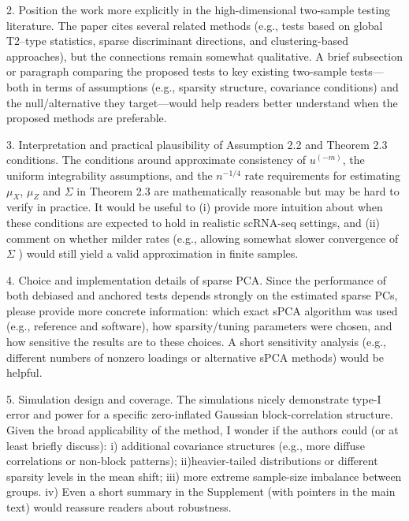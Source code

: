 \documentclass{article}
\theoremstyle{definition}
\begin{document}
\begin{shaded}
2. Position the work more explicitly in the high-dimensional two-sample testing literature.
The paper cites several related methods (e.g., tests based on global T2–type statistics, sparse discriminant directions, and clustering-based approaches), but the connections remain somewhat qualitative. A brief subsection or paragraph comparing the proposed tests to key existing two-sample tests—both in terms of assumptions (e.g., sparsity structure, covariance conditions) and the null/alternative they target—would help readers better understand when the proposed methods are preferable.
\end{shaded}

\begin{shaded}
    3. Interpretation and practical plausibility of Assumption 2.2 and Theorem 2.3 conditions. The conditions around approximate consistency of $u^{(-m)}$, the uniform integrability assumptions, and the $n^{-1 / 4}$ rate requirements for estimating $\mu_X$, $\mu_Z$ and $\Sigma$ in Theorem 2.3 are mathematically reasonable but may be hard to verify in practice. It would be useful to (i) provide more intuition about when these conditions are expected to hold in realistic scRNA-seq settings, and (ii) comment on whether milder rates (e.g., allowing somewhat slower convergence of $\Sigma$ ) would still yield a valid approximation in finite samples.
\end{shaded}

\begin{shaded}
4. Choice and implementation details of sparse PCA.
Since the performance of both debiased and anchored tests depends strongly on the estimated sparse PCs, please provide more concrete information: which exact sPCA algorithm was used (e.g., reference and software), how sparsity/tuning parameters were chosen, and how sensitive the results are to these choices. A short sensitivity analysis (e.g., different numbers of nonzero loadings or alternative sPCA methods) would be helpful.
\end{shaded}

\begin{shaded}  
5. Simulation design and coverage.
The simulations nicely demonstrate type-I error and power for a specific zero-inflated Gaussian block-correlation structure. Given the broad applicability of the method, I wonder if the authors could (or at least briefly discuss): i) additional covariance structures (e.g., more diffuse correlations or non-block patterns); ii)heavier-tailed distributions or different sparsity levels in the mean shift; iii) more extreme sample-size imbalance between groups. iv) Even a short summary in the Supplement (with pointers in the main text) would reassure readers about robustness.
\end{shaded}
\end{document}
